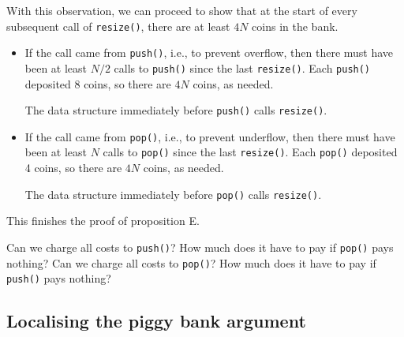 \documentclass{tufte-handout}
\begin{document}
With this observation, we can proceed to show that at the start of
every subsequent call of {\tt resize()}, there are at least $4N$ coins
in the bank.
\begin{itemize}
\item If the call came from \texttt{push()}, i.e., to prevent
  overflow, then there must have been at least $N/2$ calls to
  \texttt{push()} since the last \texttt{resize()}. Each
  \texttt{push()} deposited 8 coins, so there are $4N$ coins, as
  needed.
\begin{marginfigure}
  \caption{The data structure immediately before \texttt{push()} calls
    \texttt{resize()}.}
\end{marginfigure}
\item If the call came from \texttt{pop()}, i.e., to prevent underflow,
  then there must have been at least $N$ calls to \texttt{pop()} since
  the last \texttt{resize()}. Each \texttt{pop()} deposited 4 coins,
  so there are $4N$ coins, as needed.
\begin{marginfigure}
  \caption{The data structure immediately before \texttt{pop()} calls {\tt resize()}.}
\end{marginfigure}
\end{itemize}
This finishes the proof of proposition E.

\begin{ExerciseList}
  \Exercise Can we charge all costs to
  \texttt{push()}? How much does it have to pay if \texttt{pop()} pays nothing?
  \Exercise Can we charge all costs to
  \texttt{pop()}? How much does it have to pay if \texttt{push()} pays nothing?
\end{ExerciseList}

\subsection{Localising the piggy bank argument}
\end{document}
